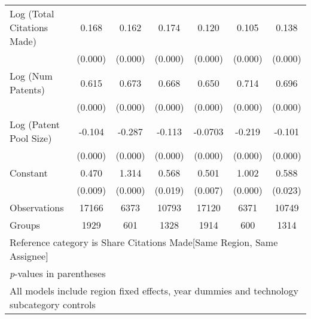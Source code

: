 \begin{table}[htbp]
\begin{adjustbox}{angle=90}
\begin{tabular}{l*{6}{c}}
Log (Total Citations Made)&    0.168&    0.162&    0.174&    0.120&    0.105&    0.138\\
                &  (0.000)&  (0.000)&  (0.000)&  (0.000)&  (0.000)&  (0.000)\\
Log (Num Patents)&    0.615&    0.673&    0.668&    0.650&    0.714&    0.696\\
                &  (0.000)&  (0.000)&  (0.000)&  (0.000)&  (0.000)&  (0.000)\\
Log (Patent Pool Size)&   -0.104&   -0.287&   -0.113&  -0.0703&   -0.219&   -0.101\\
                &  (0.000)&  (0.000)&  (0.000)&  (0.000)&  (0.000)&  (0.000)\\
Constant        &    0.470&    1.314&    0.568&    0.501&    1.002&    0.588\\
                &  (0.009)&  (0.000)&  (0.019)&  (0.007)&  (0.000)&  (0.023)\\
\hline
Observations    &    17166&     6373&    10793&    17120&     6371&    10749\\
Groups          &     1929&      601&     1328&     1914&      600&     1314\\
\hline\hline
\multicolumn{7}{l}{\footnotesize Reference category is Share Citations Made[Same Region, Same Assignee]}\\
\multicolumn{7}{l}{\footnotesize \textit{p}-values in parentheses}\\
\multicolumn{7}{l}{\footnotesize All models include region fixed effects, year dummies and technology subcategory controls}\\
\end{tabular}
\end{adjustbox}
\end{table}

